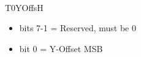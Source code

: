 \\
T0YOffsH
\begin{itemize}
\item bits 7-1 = Reserved, must be 0
\item bit 0 = Y-Offset MSB
\end{itemize}

